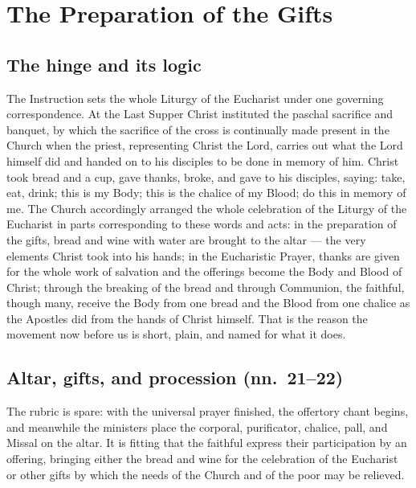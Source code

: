 \section{The Preparation of the Gifts}

\subsection{The hinge and its logic}

The Instruction sets the whole Liturgy of the Eucharist under one governing correspondence. At
the Last Supper Christ instituted the paschal sacrifice and banquet, by which the sacrifice of
the cross is continually made present in the Church when the priest, representing Christ the
Lord, carries out what the Lord himself did and handed on to his disciples to be done in
memory of him. Christ took bread and a cup, gave thanks, broke, and gave to his disciples,
saying: take, eat, drink; this is my Body; this is the chalice of my Blood; do this in memory of
me. The Church accordingly arranged the whole celebration of the Liturgy of the Eucharist in
parts corresponding to these words and acts: in the preparation of the gifts, bread and wine
with water are brought to the altar --- the very elements Christ took into his hands; in the
Eucharistic Prayer, thanks are given for the whole work of salvation and the offerings become
the Body and Blood of Christ; through the breaking of the bread and through Communion, the
faithful, though many, receive the Body from one bread and the Blood from one chalice as the
Apostles did from the hands of Christ himself. That is the reason the movement now
before us is short, plain, and named for what it does.

\subsection{Altar, gifts, and procession (nn.\ 21--22)}

The rubric is spare: with the universal prayer finished, the offertory chant begins, and
meanwhile the ministers place the corporal, purificator, chalice, pall, and Missal on the
altar. It is fitting that the faithful express their participation by an offering, bringing
either the bread and wine for the celebration of the Eucharist or other gifts by which the
needs of the Church and of the poor may be relieved.

